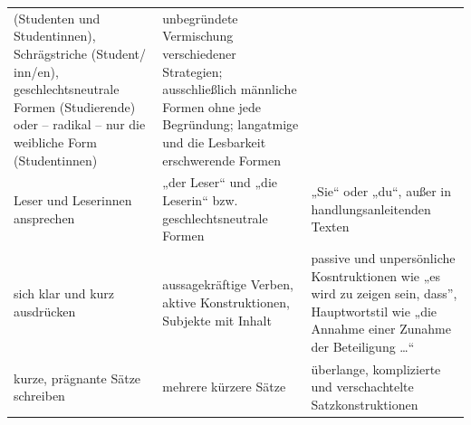 \documentclass[]{book}
\theoremstyle{definition}
\theoremstyle{definition}
\theoremstyle{definition}
\theoremstyle{remark}
\begin{document}
\begin{longtable}[]{@{}lll@{}}
\begin{minipage}[t]{0.42\columnwidth}
(Studenten und Studentinnen), Schrägstriche (Student/ inn/en),
geschlechtsneutrale Formen (Studierende) oder -- radikal -- nur die
weibliche Form (Studentinnen)\strut
\end{minipage} & \begin{minipage}[t]{0.39\columnwidth}\raggedright\strut
unbegründete Vermischung verschiedener Strategien; ausschließlich
männliche Formen ohne jede Begründung; langatmige und die Lesbarkeit
erschwerende Formen \vspace{-6mm}\strut
\end{minipage}\tabularnewline
\begin{minipage}[t]{0.11\columnwidth}\raggedright\strut
Leser und Leserinnen ansprechen\strut
\end{minipage} & \begin{minipage}[t]{0.42\columnwidth}\raggedright\strut
„der Leser`` und „die Leserin`` bzw. geschlechtsneutrale Formen\strut
\end{minipage} & \begin{minipage}[t]{0.39\columnwidth}\raggedright\strut
„Sie`` oder „du``, außer in handlungsanleitenden Texten
\vspace{-6mm}\strut
\end{minipage}\tabularnewline
\begin{minipage}[t]{0.11\columnwidth}\raggedright\strut
sich klar und kurz ausdrücken\strut
\end{minipage} & \begin{minipage}[t]{0.42\columnwidth}\raggedright\strut
aussagekräftige Verben, aktive Konstruktionen, Subjekte mit Inhalt\strut
\end{minipage} & \begin{minipage}[t]{0.39\columnwidth}\raggedright\strut
passive und unpersönliche Kosntruktionen wie „es wird zu zeigen sein,
dass'', Hauptwortstil wie „die Annahme einer Zunahme der Beteiligung
\ldots{}`` \vspace{-6mm}\strut
\end{minipage}\tabularnewline
\begin{minipage}[t]{0.11\columnwidth}\raggedright\strut
kurze, prägnante Sätze schreiben\strut
\end{minipage} & \begin{minipage}[t]{0.42\columnwidth}\raggedright\strut
mehrere kürzere Sätze\strut
\end{minipage} & \begin{minipage}[t]{0.39\columnwidth}\raggedright\strut
überlange, komplizierte und verschachtelte Satzkonstruktionen

\end{minipage}
\end{longtable}
\end{document}
